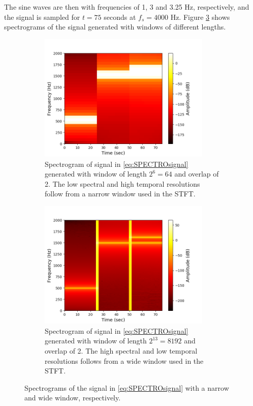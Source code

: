 The sine waves are then with frequencies of 1, 3 and 3.25 Hz, respectively, and the signal is sampled for $t=75$ seconds at $f_s=4000$ Hz. Figure \ref{fig:test_stft} shows spectrograms of the signal generated with windows of different lengths.
\begin{figure}[H]
\centering
\begin{subfigure}{0.49\textwidth}
\centering
\includegraphics[width=0.9\textwidth]{figures/validation/stft/1.png}
\caption{Spectrogram of signal in \eqref{eq:SPECTROsignal} generated with window of length $2^6=64$ and overlap of 2. The low spectral and high temporal resolutions follow from a narrow window used in the STFT.}
\label{fig:test_stft1}
\end{subfigure}
\begin{subfigure}{0.49\textwidth}
\centering
\includegraphics[width=0.9\textwidth]{figures/validation/stft/2.png}
\caption{Spectrogram of signal in \eqref{eq:SPECTROsignal} generated with window of length $2^{13}=8192$ and overlap of 2. The high spectral and low temporal resolutions follows from a wide window used in the STFT.}
\label{fig:test_stft2}
\end{subfigure}
\caption{Spectrograms of the signal in \eqref{eq:SPECTROsignal} with a narrow and wide window, respectively.}
\label{fig:test_stft}
\end{figure}

